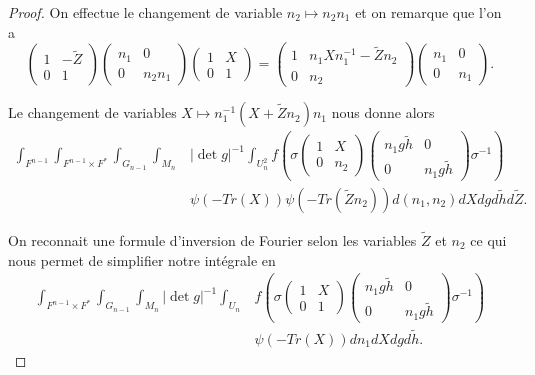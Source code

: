 \documentclass{amsart}
\begin{document}
\begin{proof}
On effectue le changement de variable $n_2 \mapsto n_2n_1$ et on remarque que l'on a
\begin{equation}
\begin{pmatrix}
1 & -\widetilde{Z} \\
0 & 1
\end{pmatrix}  \begin{pmatrix}
n_1 & 0 \\
0 & n_2n_1
\end{pmatrix} \begin{pmatrix}
1 & X \\
0 & 1
\end{pmatrix} = \begin{pmatrix}
1 & n_1Xn_1^{-1}-\widetilde{Z}n_2 \\
0 & n_2
\end{pmatrix}  \begin{pmatrix}
n_1 & 0 \\
0 & n_1
\end{pmatrix}.
\end{equation}

Le changement de variables $X \mapsto n_1^{-1}(X + \widetilde{Z}n_2)n_1$ nous donne alors
\begin{equation}
\begin{split}
\int_{F^{n-1}} \int_{F^{n-1} \times F^*} \int_{G_{n-1}} \int_{M_n}  & |\det g|^{-1}\int_{U_n^2} f\left(\sigma \begin{pmatrix}
1 & X \\
0 & n_2
\end{pmatrix} \begin{pmatrix}
n_1g\widetilde{h} & 0 \\
0 & n_1g\widetilde{h}
\end{pmatrix} \sigma^{-1} \right) \\
& \psi(-Tr(X))  \psi(-Tr(\widetilde{Z}n_2)) d(n_1,n_2) dX dg d\widetilde{h} d\widetilde{Z}.
\end{split}
\end{equation}

On reconnait une formule d'inversion de Fourier selon les variables $\widetilde{Z}$ et $n_2$ ce qui nous permet de simplifier notre intégrale en
\begin{equation}
\label{combg}
\begin{split}
\int_{F^{n-1} \times F^*} \int_{G_{n-1}} \int_{M_n}  |\det g|^{-1}\int_{U_n} & f\left(\sigma \begin{pmatrix}
1 & X \\
0 & 1
\end{pmatrix} \begin{pmatrix}
n_1g\widetilde{h} & 0 \\
0 & n_1g\widetilde{h}
\end{pmatrix} \sigma^{-1} \right) \\
& \psi(-Tr(X))  dn_1 dX dg d\widetilde{h}.
\end{split}
\end{equation}


\end{proof}
\end{document}
